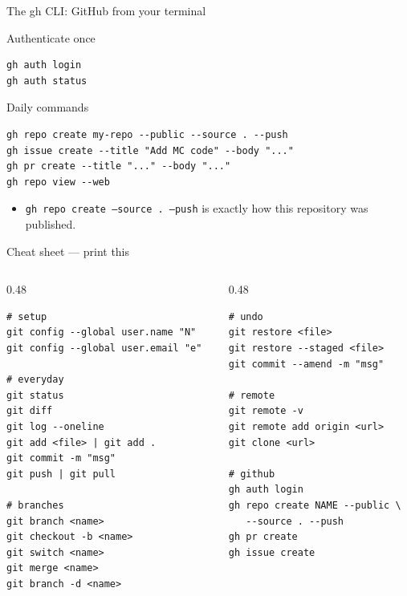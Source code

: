 \documentclass[aspectratio=169]{beamer}
\begin{document}
\begin{frame}[fragile]{The gh CLI: GitHub from your terminal}
  \begin{block}{Authenticate once}
    \begin{lstlisting}
gh auth login
gh auth status
    \end{lstlisting}
  \end{block}
  \begin{block}{Daily commands}
    \begin{lstlisting}
gh repo create my-repo --public --source . --push
gh issue create --title "Add MC code" --body "..."
gh pr create --title "..." --body "..."
gh repo view --web
    \end{lstlisting}
  \end{block}
  \begin{itemize}
    \item \texttt{gh repo create --source . --push} is exactly how this
          repository was published.
  \end{itemize}
\end{frame}

\begin{frame}[fragile]{Cheat sheet --- print this}
  \begin{columns}[T]
    \begin{column}{0.48\textwidth}
      \begin{lstlisting}[basicstyle=\ttfamily\scriptsize]
# setup
git config --global user.name "N"
git config --global user.email "e"

# everyday
git status
git diff
git log --oneline
git add <file> | git add .
git commit -m "msg"
git push | git pull

# branches
git branch <name>
git checkout -b <name>
git switch <name>
git merge <name>
git branch -d <name>
      \end{lstlisting}
    \end{column}
    \begin{column}{0.48\textwidth}
      \begin{lstlisting}[basicstyle=\ttfamily\scriptsize]
# undo
git restore <file>
git restore --staged <file>
git commit --amend -m "msg"

# remote
git remote -v
git remote add origin <url>
git clone <url>

# github
gh auth login
gh repo create NAME --public \
   --source . --push
gh pr create
gh issue create
      \end{lstlisting}
    \end{column}
  \end{columns}
\end{frame}
\end{document}
